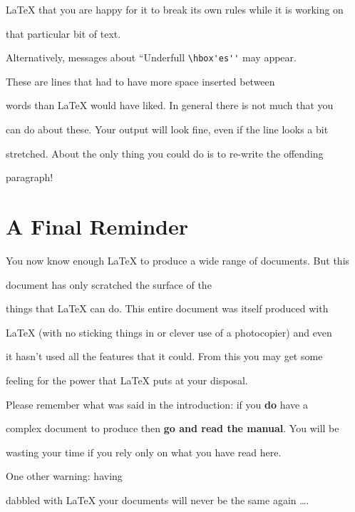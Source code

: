 \LaTeX{} that you are happy for it to break its own rules while it is working on

that particular bit of text.



Alternatively, messages about ``Underfull \verb|\hbox'es''| may appear.

These are lines that had to have more space inserted between

words than \LaTeX{} would have liked.  In general there is not much that you

can do about these.  Your output will look fine, even if the line looks a bit

stretched.  About the only thing you could do is to re-write the offending

paragraph!



\section{A Final Reminder}



You now know enough \LaTeX{} to produce a wide range of documents.  But this

document has only scratched the surface of the

things that \LaTeX{} can do.  This entire document was itself produced with

\LaTeX{} (with no sticking things in or clever use of a photocopier) and even

it hasn't used all the features that it could.  From this you may get some

feeling for the power that \LaTeX{} puts at your disposal.



Please remember what was said in the introduction: if you {\bf do} have a

complex document to produce then {\bf go and read the manual}.  You will be

wasting your time if you rely only on what you have read here.



One other warning: having

dabbled with \LaTeX{} your documents will never be the same again \ldots.





